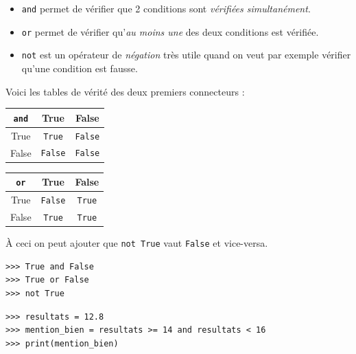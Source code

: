 \begin{itemize}
	\item   \texttt{and} permet de vérifier que 2 conditions sont \textit{vérifiées simultanément}.
	\item   \texttt{or} permet de vérifier qu'\textit{au moins une} des deux conditions est vérifiée.
	\item   \texttt{not} est un opérateur de \textit{négation} très utile quand on veut par exemple vérifier qu'une condition est fausse.
\end{itemize}
Voici les tables de vérité des deux premiers connecteurs :
\tabstyle[UGLiBlue]
\begin{center}

	\begin{tabular}{|c|c|c|}
		\hline
		\texttt{and} & \ccell True                & \ccell False               \\
		\hline
		\ccell True              & \texttt{True}  & \texttt{False} \\
		\hline
		\ccell False             & \texttt{False} & \texttt{False} \\
		\hline
	\end{tabular}\hspace{2em}
	\begin{tabular}{|c|c|c|}
		\hline
		\texttt{or} & \ccell True                & \ccell False              \\
		\hline
		\ccell True             & \texttt{False} & \texttt{True} \\
		\hline
		\ccell False            & \texttt{True}  & \texttt{True} \\
		\hline
	\end{tabular}
\end{center}
À ceci on peut ajouter que \texttt{not True} vaut \texttt{False} et vice-versa.

\begin{pyc}
	\begin{verbatim}
>>> True and False
>>> True or False
>>> not True
    \end{verbatim}
\end{pyc}

\begin{pyc}
	\begin{verbatim}
>>> resultats = 12.8
>>> mention_bien = resultats >= 14 and resultats < 16
>>> print(mention_bien)
    \end{verbatim}
\end{pyc}

